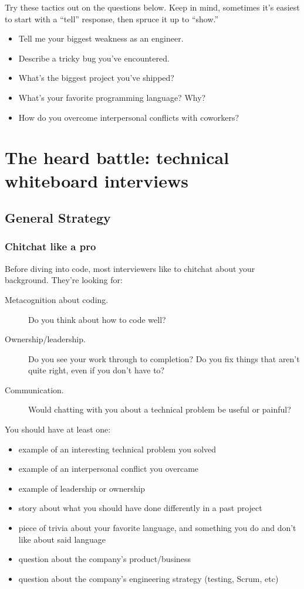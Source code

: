 \documentclass{article}
\begin{document}
Try these tactics out on the questions below. Keep in mind, sometimes it’s easiest to start with a “tell” response, then spruce it up to “show.”


\begin{itemize}
\item Tell me your biggest weakness as an engineer.
\item Describe a tricky bug you’ve encountered.
\item What’s the biggest project you’ve shipped?
\item What’s your favorite programming language? Why?
\item How do you overcome interpersonal conflicts with coworkers?
\end{itemize}

\section{The heard battle: technical whiteboard interviews}


\subsection{General Strategy}

\subsubsection{Chitchat like a pro}

Before diving into code, most interviewers like to chitchat about your background. They're looking for:

\begin{description}
\item[Metacognition about coding.] Do you think about how to code well?
\item[Ownership/leadership.] Do you see your work through to completion? Do you fix things that aren't quite right, even if you don't have to? 
\item[Communication.] Would chatting with you about a technical problem be useful or painful? 
\end{description}



You should have at least one:
\begin{itemize}
\item example of an interesting technical problem you solved
\item example of an interpersonal conflict you overcame
\item example of leadership or ownership
\item story about what you should have done differently in a past project
\item piece of trivia about your favorite language, and something you do and don't like about said language
\item question about the company's product/business
\item question about the company's engineering strategy (testing, Scrum, etc)
\end{itemize}
\end{document}
